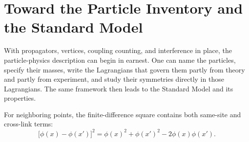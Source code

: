 \section{Toward the Particle Inventory and the Standard Model}

With propagators, vertices, coupling counting, and interference in place, the particle-physics description can begin in earnest. One can name the particles, specify their masses, write the Lagrangians that govern them partly from theory and partly from experiment, and study their symmetries directly in those Lagrangians. The same framework then leads to the Standard Model and its properties.

\begin{classroomqa}
\end{classroomqa}

\begin{classroomqa}
\end{classroomqa}

For neighboring points, the finite-difference square contains both same-site and cross-link terms:
\begin{equation}
\bigl[\phi(x)-\phi(x')\bigr]^2
=
\phi(x)^2+\phi(x')^2-2\phi(x)\phi(x').
\end{equation}

\begin{classroomqa}
\end{classroomqa}
